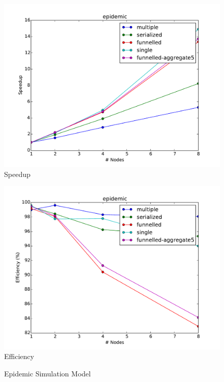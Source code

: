 \documentclass[11pt]{book}
\begin{document}
\pagebreak
\begin{figure}
  \begin{minipage}{.5\textwidth}
    \begin{center}
      \includegraphics[width=\textwidth,keepaspectratio,quiet]{figs/partitioning_communication/communication_epidemic_speedup.pdf} \\
      Speedup \\
    \end{center}
  \end{minipage}%
  \hfill
  \begin{minipage}{.5\textwidth}
    \begin{center}
      \includegraphics[width=\textwidth,keepaspectratio,quiet]{figs/partitioning_communication/communication_epidemic_efficiency.pdf} \\
      Efficiency
    \end{center}
  \end{minipage}
  \caption{Epidemic Simulation Model}\label{epidemic_communication}
\end{figure}
\end{document}
